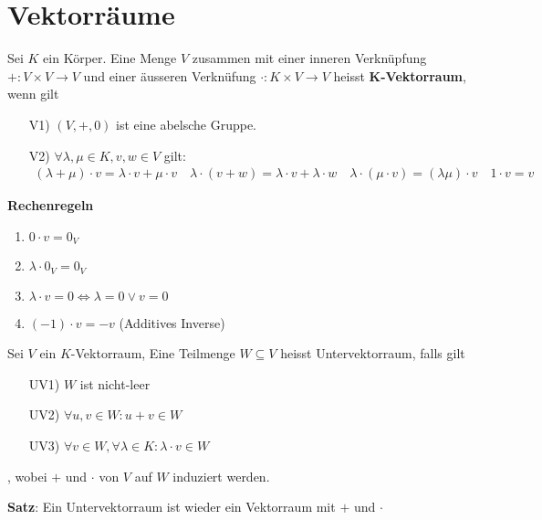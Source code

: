 \section{Vektorräume}
\begin{mdframed}
Sei $K$ ein Körper. Eine Menge $V$ zusammen mit einer inneren Verknüpfung $+: V \times V \rightarrow V$ und einer äusseren Verknüfung $\cdot : K \times V \rightarrow V$ heisst $\mathbf{K}$\textbf{-Vektorraum}, wenn gilt
\begin{itemize}
    \item[V1)] $(V,+,0)$ ist eine abelsche Gruppe.
    \item[V2)] $\forall \lambda, \mu \in K, v, w \in V$ gilt:
    \begin{align*}
        (\lambda + \mu) \cdot v  = \lambda \cdot v + \mu \cdot v \quad \lambda \cdot (v + w) = \lambda \cdot v + \lambda \cdot w \quad
        \lambda \cdot (\mu \cdot v) = (\lambda \mu) \cdot v \quad 1 \cdot v = v
    \end{align*}
\end{itemize}
\end{mdframed}
\textbf{Rechenregeln}
\begin{enumerate}[{(}a{)}]
    \item $0 \cdot v = 0_V$
    
    \item $\lambda \cdot 0_V = 0_V$
    
    \item $\lambda \cdot v = 0 \Leftrightarrow \lambda = 0 \lor v = 0$
    
    \item $(-1) \cdot v = -v$ (Additives Inverse)
\end{enumerate}
\begin{mdframed}
Sei $V$ ein $K$-Vektorraum, Eine Teilmenge $W \subseteq V$ heisst Untervektorraum, falls gilt
\begin{itemize}
    \item[UV1)] $W$ ist nicht-leer
    
    \item[UV2)] $\forall u, v \in W: u + v \in W$
    
    \item[UV3)] $\forall v \in W, \forall \lambda \in K: \lambda \cdot v \in W$
\end{itemize}
, wobei $+$ und $\cdot$ von $V$ auf $W$ induziert werden.
\end{mdframed}
\textbf{Satz}: Ein Untervektorraum ist wieder ein Vektorraum mit $+$ und $\cdot$\\
